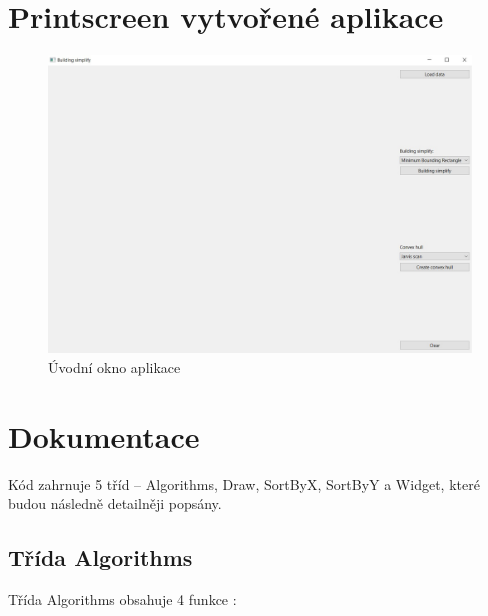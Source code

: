 \documentclass[11pt]{article}
\begin{document}
		\section{Printscreen vytvořené aplikace}
		\begin{figure}[htbh]
			\centering
			\includegraphics[scale=0.4]{images/U2_aplikace_uvodni_okno.jpg} 
			\caption{Úvodní okno aplikace}
			\label{fig:uvodni_okno}
		\end{figure} 
		
		
		\section{Dokumentace}
		Kód zahrnuje 5 tříd – Algorithms, Draw, SortByX, SortByY a Widget, které budou následně detailněji popsány.      
		
		\subsection{Třída Algorithms}
		Třída Algorithms obsahuje 4 funkce :  
		
\end{document}
